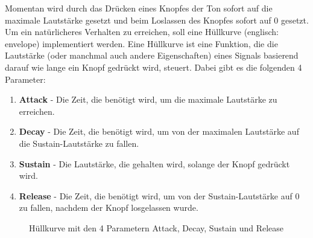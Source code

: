 Momentan wird durch das Drücken eines Knopfes der Ton sofort auf die maximale 
Lautstärke gesetzt und beim Loslassen des Knopfes sofort auf 0 gesetzt.
Um ein natürlicheres Verhalten zu erreichen, soll eine Hüllkurve (englisch: envelope)
\cite{envelope} implementiert werden. Eine Hüllkurve ist eine Funktion,
die die Lautstärke (oder manchmal auch andere Eigenschaften) eines Signals basierend darauf wie lange ein Knopf gedrückt wird, steuert.
Dabei gibt es die folgenden 4 Parameter:
\begin{enumerate}
    \item \textbf{Attack} - Die Zeit, die benötigt wird, um die maximale Lautstärke zu erreichen.
    \item \textbf{Decay} - Die Zeit, die benötigt wird, um von der maximalen Lautstärke auf die Sustain-Lautstärke zu fallen.
    \item \textbf{Sustain} - Die Lautstärke, die gehalten wird, solange der Knopf gedrückt wird.
    \item \textbf{Release} - Die Zeit, die benötigt wird, um von der Sustain-Lautstärke auf 0 zu fallen, nachdem der Knopf losgelassen wurde.
\end{enumerate}

\begin{figure}[ht]
    \centering
    \caption{Hüllkurve mit den 4 Parametern Attack, Decay, Sustain und Release}
    \label{fig:envelope}
\end{figure}

